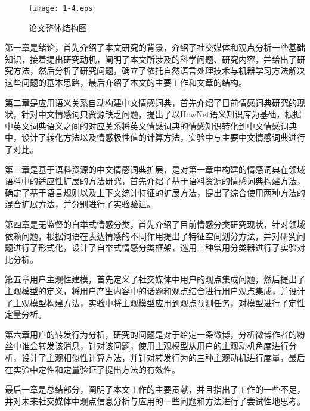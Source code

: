 \begin{figure}[htp]
\centering
\texttt{[image: 1-4.eps]}
\caption{论文整体结构图}
\label{fig1-4}
\end{figure}

第一章是绪论，首先介绍了本文研究的背景，介绍了社交媒体和观点分析一些基础知识，接着提出研究动机，阐明了本文所涉及的科学问题、研究内容，并给出了研究方法，然后分析了研究问题，确立了依托自然语言处理技术与机器学习方法解决这些问题的基本思路，最后介绍了本文的主要工作和文章的结构。

第二章是应用语义关系自动构建中文情感词典，首先介绍了目前情感词典研究的现状，针对中文情感词典资源缺乏问题，提出了以HowNet语义知识库为基础，根据中英文词典语义之间的对应关系将英文情感词典的情感知识转化到中文情感词典中，设计了转化方法以及情感极性值的计算方法，实验中与主要中文情感词典进行了对比。

第三章是基于语料资源的中文情感词典扩展，是对第一章中构建的情感词典在领域语料中的适应性扩展的方法研究，首先介绍了基于语料资源的情感词典构建方法，确定了基于语言规则以及上下文统计特征的扩展方法，提出了综合使用两种方法的混合扩展方法，并分别进行了实验验证。

第四章是无监督的自举式情感分类，首先介绍了目前情感分类研究现状，针对领域依赖问题，根据词语在表达情感的不同作用提出了特征空间划分方法，并对研究问题进行了形式化，设计了自举式情感分类框架，选用三种常用分类器进行了实验对比分析。

第五章用户主观性建模，首先定义了社交媒体中用户的观点集成问题，然后提出了主观模型的定义，将用户产生内容中的话题和观点结合进行用户观点集成，并设计了主观模型构建方法，实验中将主观模型应用到观点预测任务，对模型进行了定性定量分析。

第六章用户的转发行为分析，研究的问题是对于给定一条微博，分析微博作者的粉丝中谁会转发该消息，针对该问题，使用主观模型从用户的主观动机角度进行分析，设计了主观相似性计算方法，并针对转发行为的三种主观动机进行度量，最后在实验中定性和定量验证了提出方法的有效性。

最后一章是总结部分，阐明了本文工作的主要贡献，并且指出了工作的一些不足，并对未来社交媒体中观点信息分析与应用的一些问题和方法进行了尝试性地思考。


\newpage 
\mbox{} 
\newpage